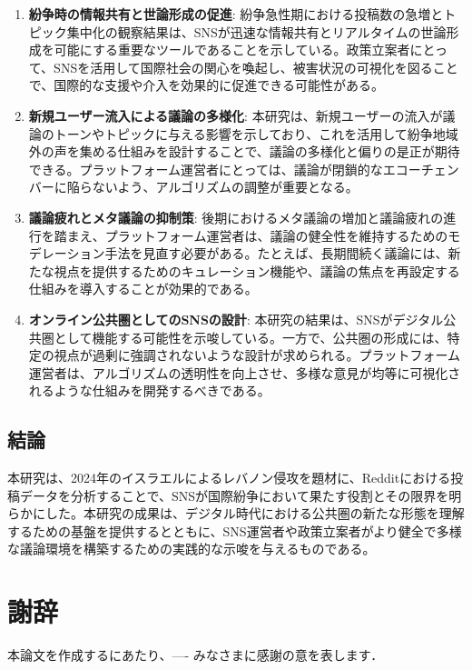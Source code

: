 \documentclass[11pt, a4j]{jreport}
\begin{document}
    \begin{enumerate}
        \item \textbf{紛争時の情報共有と世論形成の促進}:
        紛争急性期における投稿数の急増とトピック集中化の観察結果は、SNSが迅速な情報共有とリアルタイムの世論形成を可能にする重要なツールであることを示している。政策立案者にとって、SNSを活用して国際社会の関心を喚起し、被害状況の可視化を図ることで、国際的な支援や介入を効果的に促進できる可能性がある。

        \item \textbf{新規ユーザー流入による議論の多様化}:
        本研究は、新規ユーザーの流入が議論のトーンやトピックに与える影響を示しており、これを活用して紛争地域外の声を集める仕組みを設計することで、議論の多様化と偏りの是正が期待できる。プラットフォーム運営者にとっては、議論が閉鎖的なエコーチェンバーに陥らないよう、アルゴリズムの調整が重要となる。

        \item \textbf{議論疲れとメタ議論の抑制策}:
        後期におけるメタ議論の増加と議論疲れの進行を踏まえ、プラットフォーム運営者は、議論の健全性を維持するためのモデレーション手法を見直す必要がある。たとえば、長期間続く議論には、新たな視点を提供するためのキュレーション機能や、議論の焦点を再設定する仕組みを導入することが効果的である。
    
        \item \textbf{オンライン公共圏としてのSNSの設計}:
        本研究の結果は、SNSがデジタル公共圏として機能する可能性を示唆している。一方で、公共圏の形成には、特定の視点が過剰に強調されないような設計が求められる。プラットフォーム運営者は、アルゴリズムの透明性を向上させ、多様な意見が均等に可視化されるような仕組みを開発するべきである。
    \end{enumerate}

    \section{結論}
    本研究は、2024年のイスラエルによるレバノン侵攻を題材に、Redditにおける投稿データを分析することで、SNSが国際紛争において果たす役割とその限界を明らかにした。本研究の成果は、デジタル時代における公共圏の新たな形態を理解するための基盤を提供するとともに、SNS運営者や政策立案者がより健全で多様な議論環境を構築するための実践的な示唆を与えるものである。


    \chapter*{謝辞} %
    本論文を作成するにあたり、---- みなさまに感謝の意を表します．


    \renewcommand{\bibname}{参考文献} %
\end{document}
